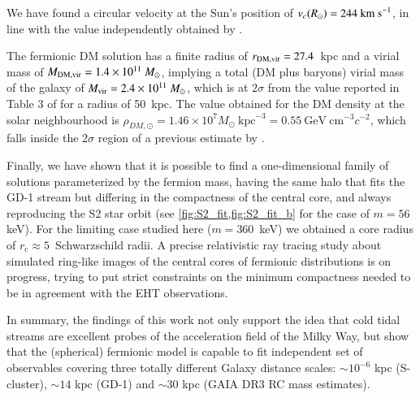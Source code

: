 \documentclass[twocolumn]{aa}
\begin{document}
We have found a circular velocity at the Sun's position of $v_c(R_\odot)= 244~\rm{km~s}^{-1}$, in line with the value independently obtained by \citet{2019MNRAS.486.2995M}.

The fermionic DM solution has a finite radius of $r_{\rm{DM,vir}}=27.4$~kpc and a virial mass of
$M_{\rm{DM,vir}}=1.4\times10^{11}~M_\odot$, implying a total (DM plus baryons) virial mass of the galaxy of $M_{\rm{vir}}= 2.4\times10^{11}~M_\odot$, which is at $2\sigma$ from the value reported in Table 3 of
\citet{2014MNRAS.445.3788G} for a radius of 50~kpc. The value obtained for the DM density at the solar neighbourhood is $\rho_{DM,\odot}=1.46\times10^7M_\odot~\mathrm{kpc}^{-3}=0.55~\mathrm{GeV}~\mathrm{cm}^{-3} c^{-2}$, which falls inside the $2\sigma$ region of a previous estimate by \citet{Salucci2010}.

Finally, we have shown that it is possible to find a one-dimensional family of solutions parameterized by the fermion mass, having the same halo that fits the GD-1 stream but differing in the compactness of the central core, and always reproducing the S2 star orbit (see \cref{fig:S2_fit,fig:S2_fit_b} for the case of $m=56$ keV). For the limiting case studied here ($m=360$~keV) we obtained a core radius of $r_\mathrm{c}\approx5$~Schwarzschild radii.
A precise relativistic ray tracing study about simulated ring-like images of the central
cores of fermionic distributions is on progress, trying to put strict constraints on the minimum
compactness needed to be in agreement with the EHT observations.

In summary, the findings of this work not only support the idea that cold tidal streams are excellent probes of the acceleration field of the Milky Way, but show that the (spherical) fermionic model is capable to fit independent set of observables covering three totally different Galaxy distance scales: $\sim 10^{-6}$ kpc (S-cluster), $\sim 14$ kpc (GD-1) and $\sim 30$ kpc (GAIA DR3 RC mass estimates).

\end{document}
